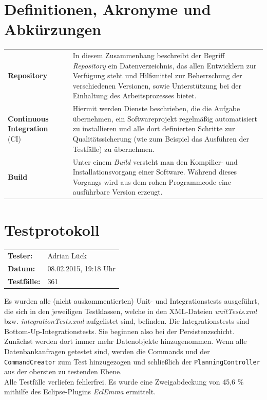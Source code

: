 \documentclass[fontsize=12pt,paper=a4,twoside]{scrartcl}
\renewcommand{\arraystretch}{1.2}
\begin{document}

\newpage

  \thispagestyle{fancy}
  \fancyhead{}
  \fancyfoot{}
  \renewcommand{\headrulewidth}{0.4pt}

\section{Definitionen, Akronyme und Abkürzungen}
\renewcommand{\arraystretch}{2}
\begin{tabularx}{\textwidth}{Xp{1cm}p{9.5cm}}
\textbf{Repository} & & In diesem Zusammenhang beschreibt der Begriff \textit{Repository} ein Datenverzeichnis, das allen Entwicklern zur Verfügung steht und Hilfsmittel zur Beherrschung der verschiedenen Versionen, sowie Unterstützung bei der Einhaltung des Arbeitsprozesses bietet.\\
\textbf{Continuous Integration} (CI) & & Hiermit werden Dienste beschrieben, die die Aufgabe übernehmen, ein Softwareprojekt regelmäßig automatisiert zu installieren und alle dort definierten Schritte zur Qualitätssicherung (wie zum Beispiel das Ausführen der Testfälle) zu übernehmen. \\
\textbf{Build} & & Unter einem \textit{Build} versteht man den Kompilier- und Installationsvorgang einer Software. Während dieses Vorgangs wird aus dem rohen Programmcode eine ausführbare Version erzeugt. \\
\end{tabularx}

\section{Testprotokoll}

\begin{tabular}{ll}
\textbf{Tester:} & Adrian Lück\\
\textbf{Datum:} & 08.02.2015, 19:18 Uhr\\
\textbf{Testfälle:} & 361
\end{tabular}

Es wurden alle (nicht auskommentierten) Unit- und Integrationstests ausgeführt, die sich in den jeweiligen Testklassen, welche in den XML-Dateien \textit{unitTests.xml} bzw. \textit{integrationTests.xml} aufgelistet sind, befinden. Die Integrationstests sind Bottom-Up-Integrationstests. Sie beginnen also bei der Persistenzschicht. Zunächst werden dort immer mehr Datenobjekte hinzugenommen. Wenn alle Datenbankanfragen getestet sind, werden die Commands und der \texttt{CommandCreator} zum Test hinzugezogen und schließlich der \texttt{PlanningController} aus der obersten zu testenden Ebene. \\
Alle Testfälle verliefen fehlerfrei. Es wurde eine Zweigabdeckung von 45,6 \% mithilfe des Eclipse-Plugins \textit{EclEmma} ermittelt.\\
\newpage
\end{document}
